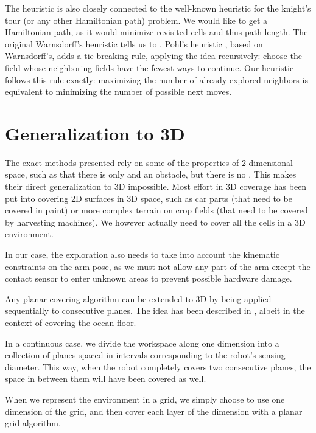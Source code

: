 \documentclass[buriama8_dp.tex]{subfiles}
\begin{document}
The heuristic is also closely connected to the well-known heuristic for the knight's tour (or any other Hamiltonian path) problem. We would like to get a Hamiltonian path, as it would minimize revisited cells and thus path length. The original Warnsdorff's heuristic tells us to . Pohl's heuristic \cite{knight_heuristic}, based on Warnsdorff's, adds a tie-breaking rule, applying the idea recursively: choose the field whose neighboring fields have the fewest ways to continue. Our heuristic follows this rule exactly: maximizing the number of already explored neighbors is equivalent to minimizing the number of possible next moves.



\section{Generalization to 3D}

The exact methods presented rely on some of the properties of 2-dimensional space, such as that there is only  and  an obstacle, but there is no . This makes their direct generalization to 3D impossible. Most effort in 3D coverage has been put into covering 2D surfaces in 3D space, such as car parts (that need to be covered in paint) or more complex terrain on crop fields (that need to be covered by harvesting machines). We however actually need to cover all the cells in a 3D environment.

In our case, the exploration also needs to take into account the kinematic constraints on the arm pose, as we must not allow any part of the arm except the contact sensor to enter unknown areas to prevent possible hardware damage.

Any planar covering algorithm can be extended to 3D by being applied sequentially to consecutive planes. The idea has been described in \cite{gen3d}, albeit in the context of covering the ocean floor.

In a continuous case, we divide the workspace along one dimension into a collection of planes spaced in intervals corresponding to the robot's sensing diameter. This way, when the robot completely covers two consecutive planes, the space in between them will have been covered as well.

When we represent the environment in a grid, we simply choose to use one dimension of the grid, and then cover each layer of the dimension with a planar grid algorithm.
\end{document}
